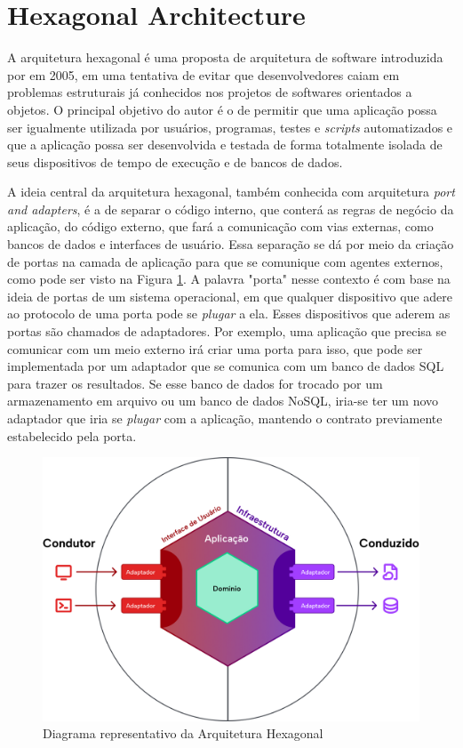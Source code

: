 \documentclass[12pt, %
openright, 
oneside, %
a4paper,    %
brazil]{facom-ufu-abntex2}
\begin{document}
\section{Hexagonal Architecture}
A arquitetura hexagonal é uma proposta de arquitetura de software introduzida por  em 2005, em uma tentativa de evitar que desenvolvedores caiam em problemas estruturais já conhecidos nos projetos de softwares orientados a objetos. O principal objetivo do autor é o de permitir que uma aplicação possa ser igualmente utilizada por usuários, programas, testes e \textit{scripts} automatizados e que a aplicação possa ser desenvolvida e testada de forma totalmente isolada de seus dispositivos de tempo de execução e de bancos de dados.

A ideia central da arquitetura hexagonal, também conhecida com arquitetura \textit{port and adapters}, é a de separar o código interno, que conterá as regras de negócio da aplicação, do código externo, que fará a comunicação com vias externas, como bancos de dados e interfaces de usuário. Essa separação se dá por meio da criação de portas na camada de aplicação para que se comunique com agentes externos, como pode ser visto na Figura \ref{fig:hex_arch_diagram}. A palavra "porta" nesse contexto é com base na ideia de portas de um sistema operacional, em que qualquer dispositivo que adere ao protocolo de uma porta pode se \textit{plugar} a ela. Esses dispositivos que aderem as portas são chamados de adaptadores. Por exemplo, uma aplicação que precisa se comunicar com um meio externo irá criar uma porta para isso, que pode ser implementada por um adaptador que se comunica com um banco de dados SQL para trazer os resultados. Se esse banco de dados for trocado por um armazenamento em arquivo ou um banco de dados NoSQL, iria-se ter um novo adaptador que iria se \textit{plugar} com a aplicação, mantendo o contrato previamente estabelecido pela porta.

\begin{figure}[ht]
    \centering
    \includegraphics[width=.6\textwidth]{figures/bibliographical_review/hex_arch_diagram.png}
    \caption{Diagrama representativo da Arquitetura Hexagonal}
    \label{fig:hex_arch_diagram}
\end{figure}
\end{document}
